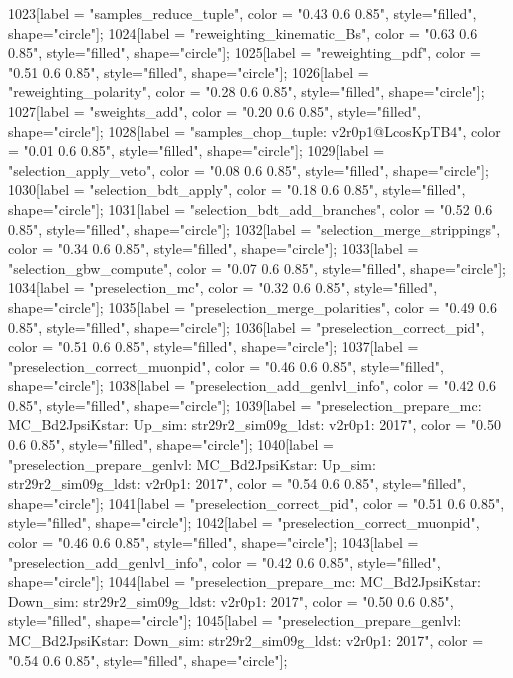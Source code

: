 {	1023[label = "samples_reduce_tuple", color = "0.43 0.6 0.85", style="filled", shape="circle"];
	1024[label = "reweighting_kinematic_Bs", color = "0.63 0.6 0.85", style="filled", shape="circle"];
	1025[label = "reweighting_pdf", color = "0.51 0.6 0.85", style="filled", shape="circle"];
	1026[label = "reweighting_polarity", color = "0.28 0.6 0.85", style="filled", shape="circle"];
	1027[label = "sweights_add", color = "0.20 0.6 0.85", style="filled", shape="circle"];
	1028[label = "samples_chop_tuple\nversion: v2r0p1@LcosKpTB4", color = "0.01 0.6 0.85", style="filled", shape="circle"];
	1029[label = "selection_apply_veto", color = "0.08 0.6 0.85", style="filled", shape="circle"];
	1030[label = "selection_bdt_apply", color = "0.18 0.6 0.85", style="filled", shape="circle"];
	1031[label = "selection_bdt_add_branches", color = "0.52 0.6 0.85", style="filled", shape="circle"];
	1032[label = "selection_merge_strippings", color = "0.34 0.6 0.85", style="filled", shape="circle"];
	1033[label = "selection_gbw_compute", color = "0.07 0.6 0.85", style="filled", shape="circle"];
	1034[label = "preselection_mc", color = "0.32 0.6 0.85", style="filled", shape="circle"];
	1035[label = "preselection_merge_polarities", color = "0.49 0.6 0.85", style="filled", shape="circle"];
	1036[label = "preselection_correct_pid", color = "0.51 0.6 0.85", style="filled", shape="circle"];
	1037[label = "preselection_correct_muonpid", color = "0.46 0.6 0.85", style="filled", shape="circle"];
	1038[label = "preselection_add_genlvl_info", color = "0.42 0.6 0.85", style="filled", shape="circle"];
	1039[label = "preselection_prepare_mc\nmode: MC_Bd2JpsiKstar\npolarity: Up\nstrip_sim: str29r2_sim09g_ldst\nversion: v2r0p1\nyear: 2017", color = "0.50 0.6 0.85", style="filled", shape="circle"];
	1040[label = "preselection_prepare_genlvl\nmode: MC_Bd2JpsiKstar\npolarity: Up\nstrip_sim: str29r2_sim09g_ldst\nversion: v2r0p1\nyear: 2017", color = "0.54 0.6 0.85", style="filled", shape="circle"];
	1041[label = "preselection_correct_pid", color = "0.51 0.6 0.85", style="filled", shape="circle"];
	1042[label = "preselection_correct_muonpid", color = "0.46 0.6 0.85", style="filled", shape="circle"];
	1043[label = "preselection_add_genlvl_info", color = "0.42 0.6 0.85", style="filled", shape="circle"];
	1044[label = "preselection_prepare_mc\nmode: MC_Bd2JpsiKstar\npolarity: Down\nstrip_sim: str29r2_sim09g_ldst\nversion: v2r0p1\nyear: 2017", color = "0.50 0.6 0.85", style="filled", shape="circle"];
	1045[label = "preselection_prepare_genlvl\nmode: MC_Bd2JpsiKstar\npolarity: Down\nstrip_sim: str29r2_sim09g_ldst\nversion: v2r0p1\nyear: 2017", color = "0.54 0.6 0.85", style="filled", shape="circle"];
}
